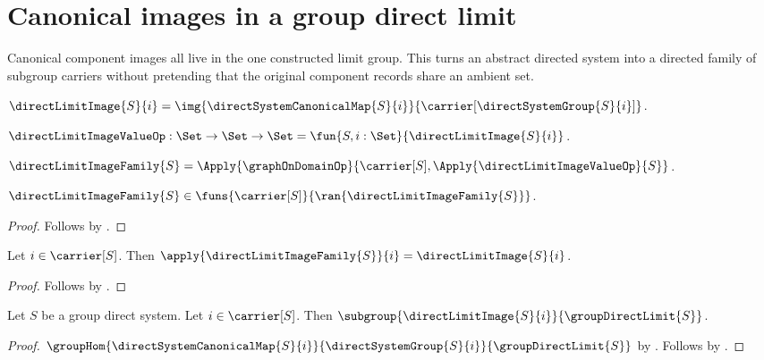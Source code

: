 

\section{Canonical images in a group direct limit}

Canonical component images all live in the one constructed limit group.  This
turns an abstract directed system into a directed family of subgroup carriers
without pretending that the original component records share an ambient set.

\begin{definition}\label{direct_limit_image}
    $\directLimitImage{S}{i}=
        \img{\directSystemCanonicalMap{S}{i}}
            {\carrier[\directSystemGroup{S}{i}]}$.
\end{definition}

\begin{definition}\label{direct_limit_image_value_op}
    $\directLimitImageValueOp:\Set\to\Set\to\Set
        =\fun{S,i:\Set}{\directLimitImage{S}{i}}$.
\end{definition}

\begin{definition}\label{direct_limit_image_family}
    $\directLimitImageFamily{S}=
        \Apply{\graphOnDomainOp}
            {\carrier[S],\Apply{\directLimitImageValueOp}{S}}$.
\end{definition}

\begin{proposition}\label{direct_limit_image_family_type}
    $\directLimitImageFamily{S}\in
        \funs{\carrier[S]}{\ran{\directLimitImageFamily{S}}}$.
\end{proposition}
\begin{proof}
    Follows by
        .
\end{proof}

\begin{proposition}\label{direct_limit_image_family_apply}
    Let $i\in\carrier[S]$.
    Then $\apply{\directLimitImageFamily{S}}{i}
        =\directLimitImage{S}{i}$.
\end{proposition}
\begin{proof}
    Follows by
        .
\end{proof}

\begin{theorem}\label{direct_limit_image_subgroup}
    Let $S$ be a group direct system.
    Let $i\in\carrier[S]$.
    Then $\subgroup{\directLimitImage{S}{i}}{\groupDirectLimit{S}}$.
\end{theorem}
\begin{proof}
    $\groupHom
        {\directSystemCanonicalMap{S}{i}}
        {\directSystemGroup{S}{i}}{\groupDirectLimit{S}}$ by
        .
    Follows by
        .
\end{proof}

